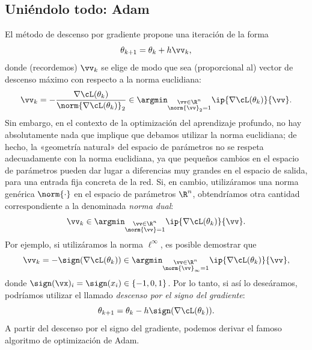 \documentclass[../../book-main_es.tex]{subfiles}
\begin{document}
\subsection{Uniéndolo todo: Adam}

El método de descenso por gradiente propone una iteración de la forma
\begin{equation}
    \theta_{k + 1} = \theta_{k} + h\vv_{k},
\end{equation}
donde (recordemos) \(\vv_{k}\) se elige de modo que sea (proporcional al)
vector de descenso máximo con respecto a la norma euclidiana:
\begin{equation}
    \vv_{k} = -\frac{\nabla \cL(\theta_{k})}{\norm{\nabla
    \cL(\theta_{k})}_{2}} \in \argmin_{\substack{\vv \in \R^{n}
    \\ \norm{\vv}_{2} = 1}}\ip{\nabla \cL(\theta_{k})}{\vv}.
\end{equation}
Sin embargo, en el contexto de la optimización del aprendizaje profundo, no hay
absolutamente nada que implique que debamos utilizar la norma euclidiana;
de hecho, la «geometría natural» del espacio de parámetros no se
respeta adecuadamente con la norma euclidiana, ya que pequeños cambios en el
espacio de parámetros pueden dar lugar a diferencias muy grandes en el espacio de salida,
para una entrada fija concreta de la red. Si, en cambio,
utilizáramos una norma genérica \(\norm{\cdot}\) en el espacio de parámetros
\(\R^{n}\), obtendríamos otra cantidad correspondiente a la
denominada \textit{norma dual}:
\begin{equation}
    \vv_{k} \in \argmin_{\substack{\vv \in \R^{n} \\ \norm{\vv} =
    1}}\ip{\nabla \cL(\theta_{k})}{\vv}.
\end{equation}
Por ejemplo, si utilizáramos la norma \(\ell^{\infty}\), es
posible demostrar que
\begin{equation}
    \vv_{k} = -\sign(\nabla \cL(\theta_{k})) \in
    \argmin_{\substack{\vv \in \R^{n} \\ \norm{\vv}_{\infty} =
    1}}\ip{\nabla \cL(\theta_{k})}{\vv},
\end{equation}
donde \(\sign(\vx)_{i} = \sign(x_{i}) \in \{-1, 0, 1\}\). Por lo tanto, si así lo
deseáramos, podríamos utilizar el llamado \textit{descenso por el signo del gradiente}:
\begin{equation}\label{eq:sign_gradient_descent}
    \theta_{k + 1} = \theta_{k} - h\sign(\nabla \cL(\theta_{k})).
\end{equation}
A partir del descenso por el signo del gradiente, podemos derivar el famoso algoritmo de optimización de Adam.
\end{document}
